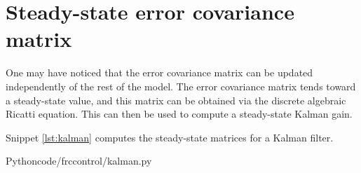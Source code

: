 \section{Steady-state error covariance matrix}

One may have noticed that the error covariance matrix can be updated
independently of the rest of the model. The error covariance matrix tends
toward a steady-state value, and this matrix can be obtained via the discrete
algebraic Ricatti equation. This can then be used to compute a steady-state
Kalman gain.

Snippet \ref{lst:kalman} computes the steady-state matrices for a Kalman
filter.

\begin{code}{Python}{code/frccontrol/kalman.py}
  \caption{Steady-state Kalman gain and error covariance matrices calculation in
    Python.}
  \label{lst:kalman}
\end{code}
